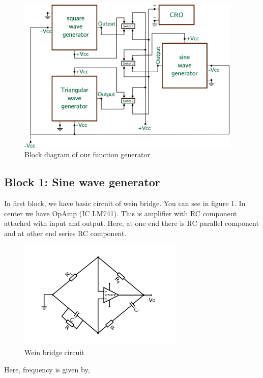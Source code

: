 \documentclass[14pt,a4paper]{extarticle}
\begin{document}
\begin{figure}[ht]
    \centering
    \includegraphics[width=0.95\textwidth]{imgs/blocks.png}
    \caption{Block diagram of our function generator}
    \label{fig:block}
\end{figure}


\subsection{Block 1: Sine wave generator}
\label{sec:org4d561d2}


In first block, we have basic circuit of wein bridge. You can see in figure 1. In center we have OpAmp (IC LM741). This is amplifier with RC component attached with input and output. Here, at one end there is RC parallel component and at other end series RC component. 


\begin{figure}[ht]
    \centering
    \label{sine}
    \includegraphics[width=0.7\textwidth]{imgs/sine.png}
    \caption{Wein bridge circuit}
\end{figure}

Here, frequency is given by, 
\end{document}
